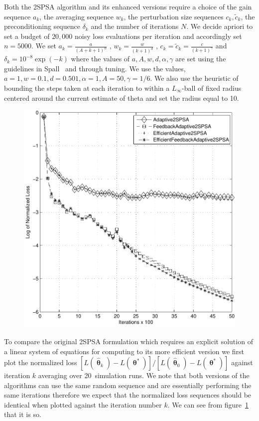 \documentclass[conference]{IEEEtran}
\newcommand{\htheta}{\bm{\hat{\uptheta}}}
\begin{document}
Both the 2SPSA algorithm and its enhanced versions require a choice of
the gain sequence $a_k$, the averaging sequence $w_k$,
the perturbation size sequences $c_k, \tilde{c}_k$, the preconditioning
sequence $\delta_k$ and the number of iterations $N$. We decide apriori to
set a budget of $20,000$ noisy loss evaluations per iteration and
accordingly set $n=5000$. We set
$a_k = \frac{a}{(A + k + 1)^\alpha}$
, $w_k = \frac{w}{(k+1)^d}$
, $c_k = \tilde{c}_k = \frac{c}{(k+1)^\gamma}$
and $\delta_k = 10^{-8}\exp(-k)$
where the values of $a, A, w, d, \alpha, \gamma$ are set using the
guidelines in Spall~\cite{Spall2000} and through tuning. We use the values,
$a=1, w=0.1, d=0.501, \alpha=1, A=50, \gamma=1/6$. We also use the heuristic of
bounding the steps taken at each iteration to within a $L_{\infty}$-ball of
fixed radius centered around the current estimate of theta and set the
radius equal to 10.

\begin{figure}[htbp]
  \centering
  \includegraphics[width=1\columnwidth]{../res/NoNoise_normalized_loss_per_iteration.pdf}
  \caption{}
  \label{fig:normalizedloss}
\end{figure}

\newcommand{\nruns}[0]{20\ }
To compare the original 2SPSA formulation which requires an explicit
solution of a linear system of equations for computing to its more efficient
version we first plot the normalized loss
$[L(\htheta_k)-L(\bm{\uptheta}^{*})]/[L(\htheta_0)-L(\bm{\uptheta}^{*})]$
against iteration $k$ averaging over \nruns simulation runs. We note that
both versions of the algorithms can use the same random sequence and
are essentially performing the same iterations therefore we expect
that the normalized loss sequences should be identical when plotted
against the iteration number $k$. We can see from figure~\ref{fig:normalizedloss}
that it is so.
\end{document}
